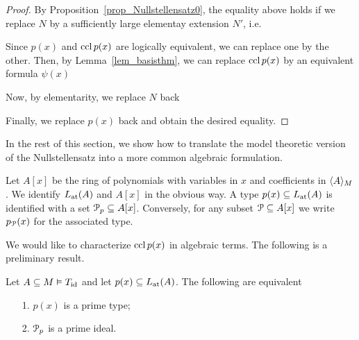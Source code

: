 \begin{proof}
  By Proposition~\ref{prop_Nullstellensatz0}, the equality above holds if we replace $N$ by a sufficiently large elementay extension $N'$, i.e.
  
  
  Since $p(x)$ and $\ccl\,p(x)$ are logically equivalent, we can replace one by the other.
  Then, by Lemma~\ref{lem_basisthm}, we can replace $\ccl\,p(x)$ by an equivalent formula $\psi(x)$
  
  
  Now, by elementarity, we replace $N$ back


  Finally, we replace $p(x)$ back and obtain the desired equality.
\end{proof}

In the rest of this section, we show how to translate the model theoretic version of the Nullstellensatz into a more common algebraic formulation.

Let $A[x]$ be the ring of polynomials with variables in $x$ and coefficients in $\<A\>_M$.
%
We identify $\atL(A)$ and $A[x]$ in the obvious way.
%
A type $p(x)\subseteq\atL(A)$ is identified with a set $\P_p\subseteq A[x]$.
Conversely, for any subset $\P\subseteq A[x]$ we write $p_\P(x)$ for the associated type.

We would like to characterize $\ccl\,p(x)$ in algebraic terms.
The following is a preliminary result.

\begin{proposition}\label{prop_tipi_e_ideali_primi}
  Let $A\subseteq M\models T_{\rm id}$ and let $p(x)\subseteq\atL(A)$.
  The following are equivalent
  \begin{itemize}
  \item[1.] $p(x)$ is a prime type;
  \item[2.] $\P_p$ is a prime ideal.
  \end{itemize}
\end{proposition}

